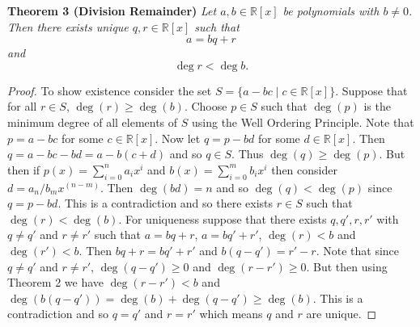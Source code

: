\documentclass{article}
\begin{document}
\begin{flushleft}
\textbf{Theorem 3 (Division Remainder)}
\textsl{Let $a,b \in \mathbb{R}[x]$ be polynomials with $b \neq 0$. Then there exists unique $q,r \in \mathbb{R}[x]$ such that
\[
a = bq + r
\]
and
\[
\deg r < \deg b.
\]}
\begin{proof}
To show existence consider the set $S = \{a-bc \mid c \in \mathbb{R}[x]\}$. Suppose that for all $r \in S$, $\deg(r) \geq \deg(b)$. Choose $p \in S$ such that $\deg(p)$ is the minimum degree of all elements of $S$ using the Well Ordering Principle. Note that $p=a-bc$ for some $c \in \mathbb{R}[x]$. Now let $q = p-bd$ for some $d \in \mathbb{R}[x]$. Then $q = a-bc-bd=a-b(c+d)$ and so $q \in S$. Thus $\deg(q) \geq \deg(p)$. But then if $p(x) = \sum_{i=0}^n a_i x^i$ and $b(x) = \sum_{i=0}^m b_i x^i$ then consider $d = a_n/b_m x^{(n-m)}$. Then $\deg(bd) = n$ and so $\deg(q) < \deg(p)$ since $q = p-bd$. This is a contradiction and so there exists $r \in S$ such that $\deg(r) < \deg(b)$. For uniqueness suppose that there exists $q,q',r,r'$ with $q \neq q'$ and $r \neq r'$ such that $a=bq+r$, $a=bq'+r'$, $\deg(r) < b$ and $\deg(r') < b$. Then $bq+r = bq'+r'$ and $b(q-q') = r'-r$. Note that since $q \neq q'$ and $r \neq r'$, $\deg(q-q') \geq 0$ and $\deg(r-r') \geq 0$. But then using Theorem 2 we have $\deg(r-r') < b$ and $\deg(b(q-q')) = \deg(b) + \deg(q-q') \geq \deg(b)$. This is a contradiction and so $q=q'$ and $r=r'$ which means $q$ and $r$ are unique.
\end{proof}

\end{flushleft}
\end{document}
